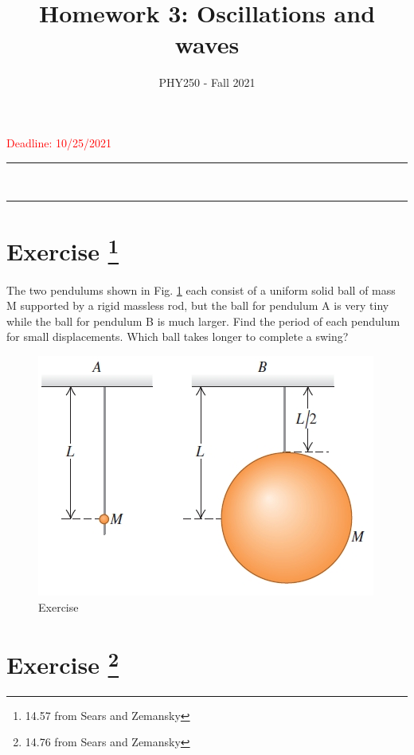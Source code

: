 \documentclass[12pt]{article}
\title{Homework 3: Oscillations and waves}
\author{PHY250 - Fall 2021}
\date{}
\newcommand{\HRule}{\rule{\linewidth}{0.5mm}}
\begin{document}
\maketitle

\textcolor{red}{Deadline: 10/25/2021}

\vspace{5mm}

\begin{spacing}{0.3}
    \noindent
    \HRule\\
    \HRule
\end{spacing}
\vspace{5mm}




\setcounter{example}{1}

\section*{Exercise \theexample \footnote{14.57 from Sears and Zemansky}}
The two pendulums shown in Fig. \ref{1}  each consist
of a uniform solid ball of mass M supported by a rigid massless
rod, but the ball for pendulum A is very tiny while the ball for pendulum
B is much larger. Find the period of each pendulum for
small displacements. Which ball takes longer to complete a swing?

\begin{figure}[h!]
  \begin{center}
    \includegraphics[height=2.in]{images/1.jpg}
    \caption{Exercise \theexample }
    \label{1}
  \end{center}
\end{figure}




\section*{Exercise \theexample \footnote{14.76  from Sears and Zemansky}}
\end{document}
